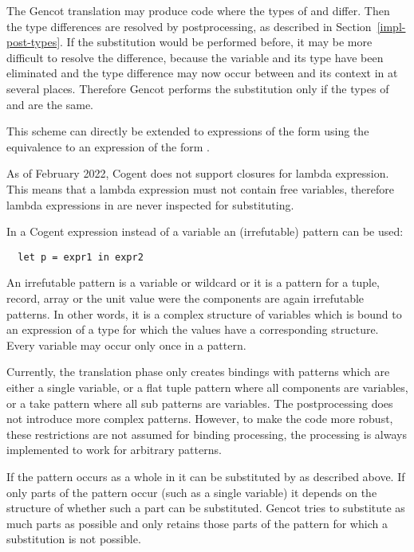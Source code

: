 The Gencot translation may produce code where the types of  and  differ. Then the type differences are
resolved by postprocessing, as described in Section~\ref{impl-post-types}. If the substitution would be performed before,
it may be more difficult to resolve the difference, because the variable and its type have been eliminated and the type
difference may now occur between  and its context in  at several places. Therefore Gencot performs
the substitution only if the types of  and  are the same.

This scheme can directly be extended to expressions of the form  using the
equivalence to an expression of the form .

As of February 2022, Cogent does not support closures for lambda expression. This means that a lambda expression must not
contain free variables, therefore lambda expressions in  are never inspected for substituting.

In a Cogent  expression instead of a variable  an (irrefutable) pattern  can be used:
\begin{verbatim}
  let p = expr1 in expr2
\end{verbatim}
An irrefutable pattern
is a variable or wildcard or it is a pattern for a tuple, record, array or the unit value were the components are again
irrefutable patterns. In other words, it is a complex structure of variables which is bound to an expression 
of a type for which the values have a corresponding structure. Every variable may occur only once in a pattern.

Currently, the translation phase only creates bindings with patterns which are either a single variable, or a flat tuple pattern where
all components are variables, or a take pattern where all sub patterns are variables. The postprocessing does not
introduce more complex patterns. However, to make the code more robust, these restrictions are not assumed for binding processing,
the processing is always implemented to work for arbitrary patterns.

If the pattern occurs as a whole in  it can be
substituted by  as described above. If only parts of the pattern occur (such as a single variable) it depends
on the structure of  whether such a part can be substituted. Gencot tries to substitute as much parts as possible 
and only retains those parts of the pattern for which a substitution is not possible.

